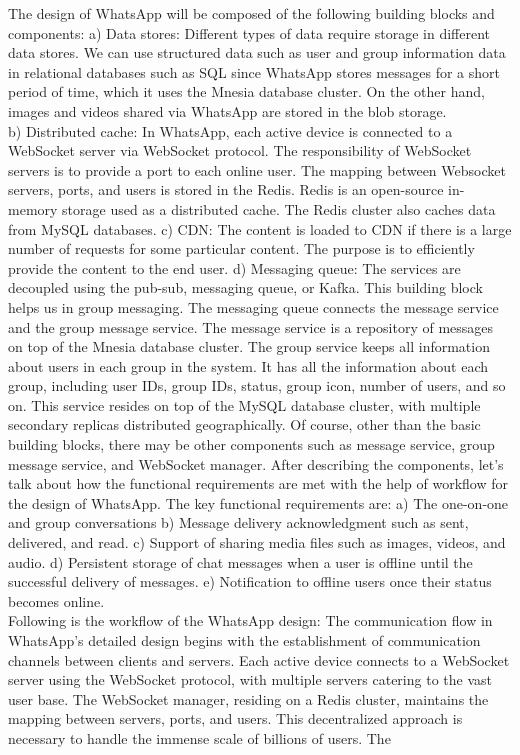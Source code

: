 The design of WhatsApp will be composed of the following building blocks and components: a) Data stores: Different types of data require storage in different data stores. We can use structured data such as user and group information data in relational databases such as SQL since WhatsApp stores messages for a short period of time, which it uses the Mnesia database cluster. On the other hand, images and videos shared via WhatsApp are stored in the blob storage.\\
b) Distributed cache: In WhatsApp, each active device is connected to a WebSocket server via WebSocket protocol. The responsibility of WebSocket servers is to provide a port to each online user. The mapping between Websocket servers, ports, and users is stored in the Redis. Redis is an open-source in-memory storage used as a distributed cache. The Redis cluster also caches data from MySQL databases. c) CDN: The content is loaded to CDN if there is a large number of requests for some particular content. The purpose is to efficiently provide the content to the end user. d) Messaging queue: The services are decoupled using the pub-sub, messaging queue, or Kafka. This building block helps us in group messaging. The messaging queue connects the message service and the group message service. The message service is a repository of messages on top of the Mnesia database cluster. The group service keeps all information about users in each group in the system. It has all the information about each group, including user IDs, group IDs, status, group icon, number of users, and so on. This service resides on top of the MySQL database cluster, with multiple secondary replicas distributed geographically. Of course, other than the basic building blocks, there may be other components such as message service, group message service, and WebSocket manager. After describing the components, let's talk about how the functional requirements are met with the help of workflow for the design of WhatsApp. The key functional requirements are: a) The one-on-one and group conversations b) Message delivery acknowledgment such as sent, delivered, and read. c) Support of sharing media files such as images, videos, and audio. d) Persistent storage of chat messages when a user is offline until the successful delivery of messages. e) Notification to offline users once their status becomes online.
\\
Following is the workflow of the WhatsApp design: The communication flow in WhatsApp's detailed design begins with the establishment of communication channels between clients and servers. Each active device connects to a WebSocket server using the WebSocket protocol, with multiple servers catering to the vast user base. The WebSocket manager, residing on a Redis cluster, maintains the mapping between servers, ports, and users. This decentralized approach is necessary to handle the immense scale of billions of users. The
